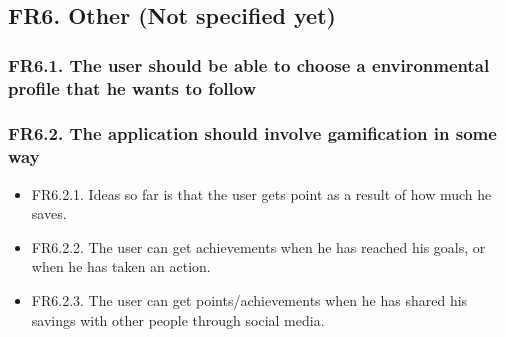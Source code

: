 \subsection{FR6. Other (Not specified yet)}
\subsubsection{FR6.1. The user should be able to choose a environmental profile that he wants to follow}
\subsubsection{FR6.2. The application should involve gamification in some way}
\begin{itemize}
\item FR6.2.1. Ideas so far is that the user gets point as a result of how much he saves.
\item FR6.2.2. The user can get achievements when he has reached his goals, or when he has taken an action.
\item FR6.2.3. The user can get points/achievements when he has shared his savings with other people through social media.
\end{itemize}